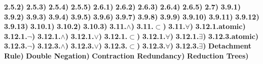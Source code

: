\documentclass{article}
\begin{document}
{\bf 2.5.2)} 
{\bf 2.5.3)} 
{\bf 2.5.4)} 
\break
{\bf 2.5.5)} 
{\bf 2.6.1)} 
{\bf 2.6.2)} 
\break
{\bf 2.6.3)} 
{\bf 2.6.4)} 
{\bf 2.6.5)} 
{\bf 2.7)} 
{\bf 3.9.1)} 
{\bf 3.9.2)} 
{\bf 3.9.3)} 
{\bf 3.9.4)} 
{\bf 3.9.5)} 
{\bf 3.9.6)} 
\break
{\bf 3.9.7)} 
{\bf 3.9.8)} 
{\bf 3.9.9)} 
{\bf 3.9.10)} 
{\bf 3.9.11)} 
{\bf 3.9.12)} 
{\bf 3.9.13)} 
{\bf 3.10.1)} 
{\bf 3.10.2)} 
{\bf 3.10.3)} 
{\bf 3.11.$\land$)} 
{\bf 3.11.$\subset$)} 
{\bf 3.11.$\forall$)} 
\break
{\bf 3.12.1.atomic)} 
{\bf 3.12.1.$\neg$)} 
{\bf 3.12.1.$\land$)} 
{\bf 3.12.1.$\lor$)} 
{\bf 3.12.1.$\subset$)} 
\break
{\bf 3.12.1.$\forall$)} 
{\bf 3.12.1.$\exists$)} 
{\bf 3.12.3.atomic)} 
{\bf 3.12.3.$\neg$)} 
\break
{\bf 3.12.3.$\land$)} 
{\bf 3.12.3.$\lor$)} 
{\bf 3.12.3.$\subset$)} 
{\bf 3.12.3.$\forall$)} 
\break
{\bf 3.12.3.$\exists$)} 
\break
{\bf Detachment Rule)} 
{\bf Double Negation)} 
{\bf Contraction Redundancy)} 
\break
{\bf Reduction Trees)} 
\end{document}
